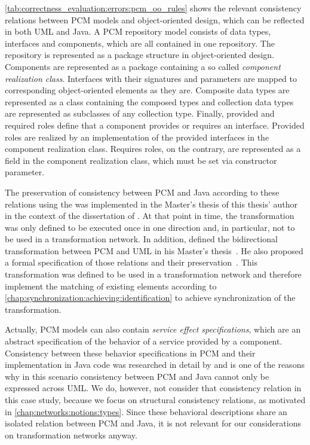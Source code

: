 \autoref{tab:correctness_evaluation:errors:pcm_oo_rules} shows the relevant consistency relations between \gls{PCM} models and object-oriented design, which can be reflected in both \gls{UML} and Java.
A \gls{PCM} repository model consists of data types, interfaces and components, which are all contained in one repository.
The repository is represented as a package structure in object-oriented design.
Components are represented as a package containing a so called \emph{component realization class}.
Interfaces with their signatures and parameters are mapped to corresponding object-oriented elements as they are.
Composite data types are represented as a class containing the composed types and collection data types are represented as subclasses of any collection type.
Finally, provided and required roles define that a component provides or requires an interface.
Provided roles are realized by an implementation of the provided interfaces in the component realization class.
Requires roles, on the contrary, are represented as a field in the component realization class, which must be set via constructor parameter.

The preservation of consistency between \gls{PCM} and Java according to these relations using the \reactionslanguage was implemented in the Master's thesis of this thesis' author~\cite{klare2016b} in the context of the dissertation of \textcite{langhammer2017a}.
At that point in time, the transformation was only defined to be executed once in one direction and, in particular, not to be used in a transformation network.
In addition, \citeauthor{syma2018ma} defined the bidirectional transformation between \gls{PCM} and \gls{UML} in his Master's thesis~\cite{syma2018ma}.
He also proposed a formal specification of those relations and their preservation~\cite[Section 5]{syma2018ma}.
This transformation was defined to be used in a transformation network and therefore implement the matching of existing elements according to \autoref{chap:synchronization:achieving:identification} to achieve synchronization of the transformation.

Actually, \gls{PCM} models can also contain \emph{service effect specifications}, which are an abstract specification of the behavior of a service provided by a component.
Consistency between these behavior specifications in \gls{PCM} and their implementation in Java code was researched in detail by \textcite{langhammer2017a} and is one of the reasons why in this scenario consistency between \gls{PCM} and Java cannot only be expressed across \gls{UML}.
We do, however, not consider that consistency relation in this case study, because we focus on structural consistency relations, as motivated in \autoref{chap:networks:notions:types}.
Since these behavioral descriptions share an isolated relation between \gls{PCM} and Java, it is not relevant for our considerations on transformation networks anyway.


